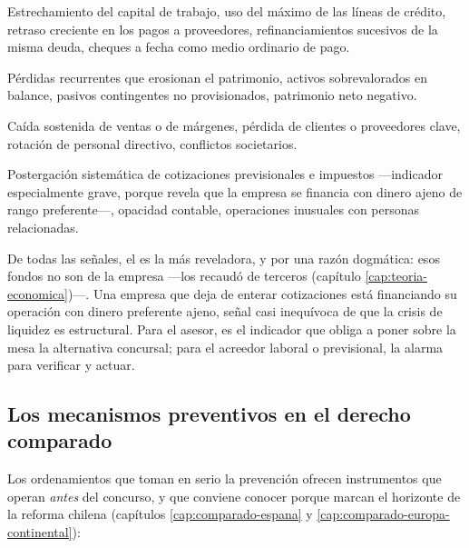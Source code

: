 \begin{description}[leftmargin=0pt,style=nextline,font=\sffamily\bfseries]
  \item[Señales de liquidez] Estrechamiento del capital de trabajo, uso del máximo de las líneas de
  crédito, retraso creciente en los pagos a proveedores, refinanciamientos sucesivos de la misma
  deuda, cheques a fecha como medio ordinario de pago.
  \item[Señales patrimoniales] Pérdidas recurrentes que erosionan el patrimonio, activos
  sobrevalorados en balance, pasivos contingentes no provisionados, patrimonio neto negativo.
  \item[Señales operativas] Caída sostenida de ventas o de márgenes, pérdida de clientes o
  proveedores clave, rotación de personal directivo, conflictos societarios.
  \item[Señales de comportamiento] Postergación sistemática de cotizaciones previsionales e
  impuestos ---indicador especialmente grave, porque revela que la empresa se financia con dinero
  ajeno de rango preferente---, opacidad contable, operaciones inusuales con personas relacionadas.
\end{description}

\begin{practica}
De todas las señales, el  es la más
reveladora, y por una razón dogmática: esos fondos no son de la empresa ---los recaudó de terceros
(capítulo \ref{cap:teoria-economica})---. Una empresa que deja de enterar cotizaciones está
financiando su operación con dinero preferente ajeno, señal casi inequívoca de que la crisis de
liquidez es estructural. Para el asesor, es el indicador que obliga a poner sobre la mesa la
alternativa concursal; para el acreedor laboral o previsional, la alarma para verificar y actuar.
\end{practica}

\subsection{Los mecanismos preventivos en el derecho comparado}

Los ordenamientos que toman en serio la prevención ofrecen instrumentos que operan \emph{antes} del
concurso, y que conviene conocer porque marcan el horizonte de la reforma chilena (capítulos
\ref{cap:comparado-espana} y \ref{cap:comparado-europa-continental}):

